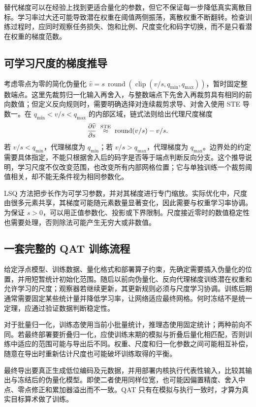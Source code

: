 \documentclass[UTF8,12pt,a4paper,fontset=fandol]{ctexart}
\begin{document}
替代梯度可以在经验上找到更适合量化的参数，但它不保证每一步降低真实离散目标。学习率过大还可能导致潜在权重在阈值两侧振荡，离散权重不断翻转。检查训练过程时，应同时观察任务损失、饱和比例、尺度变化和码字切换，而不是只看潜在权重的梯度范数。

\subsection{可学习尺度的梯度推导}
考虑零点为零的简化伪量化 $\widehat v=s\,\operatorname{round}(\operatorname{clip}(v/s,q_{\min},q_{\max}))$，暂时固定整数端点。这里先裁剪归一化输入再舍入，与整数端点下先舍入再裁剪具有相同的前向数值；但定义反向规则时，需要明确选择对连续裁剪求导、对舍入使用 STE 导数一。在 $q_{\min}<v/s<q_{\max}$ 的内部区域，链式法则给出代理尺度梯度
\begin{equation}
 \frac{\partial\widehat v}{\partial s}\;\mathrel{\mathop{\approx}^{\rm STE}}\;
 \operatorname{round}(v/s)-v/s.
 \label{eq:quant-scale-gradient}
\end{equation}
若 $v/s<q_{\min}$，代理梯度为 $q_{\min}$；若 $v/s>q_{\max}$，代理梯度为 $q_{\max}$。边界处的约定需要具体指定，不能只根据舍入后的码字是否等于端点判断反向分支。这个推导说明，学习尺度不仅改变范围，也改变所有内部网格位置；它与单独训练一个裁剪阈值相关，却不能无条件视为相同参数化。

LSQ 方法把步长作为可学习参数，并对其梯度进行专门缩放\cite{esser2020}。实际优化中，尺度由很多元素共享，其梯度可能随元素数量显著变化，因此需要与权重学习率协调。为保证 $s>0$，可以用正值参数化、投影或下界限制。尺度接近零时的数值稳定性也需要处理，否则除法可能产生无穷大或非数值。

\subsection{一套完整的 QAT 训练流程}
给定浮点模型、训练数据、量化格式和部署算子约束，先确定需要插入伪量化的位置，并用短暂统计初始化范围。随后以前向伪量化、反向代理梯度训练潜在权重和允许学习的尺度；观察器若继续更新，其更新规则必须与尺度学习协调。训练后期通常需要固定某些统计量并降低学习率，让网络适应最终网格。何时冻结不是统一定理，应通过验证数据判断稳定性。

对于批量归一化，训练态使用当前小批量统计，推理态使用固定统计；两种前向不同。若最终部署要折叠归一化，应使训练末期的模拟与折叠后量化相匹配，否则训练中适应的范围可能与导出后不同。权重、尺度和归一化参数之间可能相互补偿，随意在导出时重新估计尺度也可能破坏训练取得的平衡。

最终导出要真正生成低位编码及元数据，并用部署内核执行代表性输入，比较其输出与冻结后的伪量化模型。即使二者使用同样位宽，也可能因偏置精度、舍入中点、零点修正和累加器溢出而不一致。QAT 只有在模拟与执行一致时，才算为真实目标算术做了训练。
\end{document}
